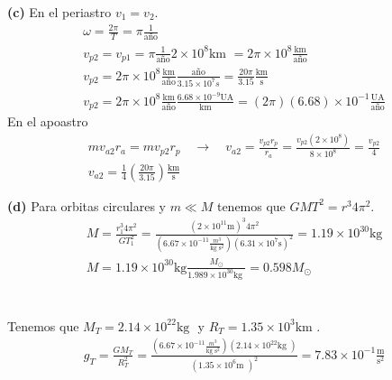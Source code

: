 \documentclass{article}
\begin{document}
\hfill 

\textbf{(c) } En el periastro $ v_1 = v_2  $. 
\begin{gather*}
  \omega = \frac{2\pi}{T} = \pi \frac{1}{\text{año}} \\
  v_{p2} = v_{p1} = \pi \frac{1}{\text{año}} 2 \times 10^8 \text{km } = 2\pi\times10^{8} \frac{\text{km}}{\text{año}} \\
  v _{p2} =2\pi \times10^{8 } \frac{\text{km}}{\text{año}} \frac{\text{año}}{3.15 \times10^{7 } s } = \frac{20\pi }{3.15 } \frac{\text{km}}{\text{s}} \\
  v _{p2}  =2\pi \times10^{8 } \frac{\text{km}}{\text{año}} \frac{6.68 \times10^{-9 }\text{UA}}{ \text{km} } = (2\pi)(6.68)\times10^{-1 } \frac{\text{UA}}{\text{año}} 
\end{gather*}
En el apoastro
\begin{gather*}
  m v _{a2 } r_a = m v _{p2 } r_p \quad \rightarrow \quad v _{a2 } = \frac{v _{p2 } r_p }{r_a } = \frac{v _{p2 } (2 \times10^{8 })}{8 \times10^{8}} = \frac{v _{p2 } }{4} \\
  v _{a2 } = \frac{1}{4}\left(\frac{20\pi}{3.15 }\right) \frac{\text{km}}{\text{s}}
\end{gather*}

\hfill 

\textbf{(d)} Para orbitas circulares y $ m\ll M $ tenemos que $ GM T^2 = r^3 4 \pi^2 $.
\begin{gather*}
  M = \frac{r_1^3 4\pi^2 }{G T_1^2} = \frac{(2 \times10^{11 }\text{m})^3 4\pi^2 }{(6.67 \times10^{-11 }\frac{m^3 }{\text{kg } \text{s}^2})(6.31 \times10^{7 } \text{s})^2} = 1.19 \times10^{30 }\text{kg} \\
  M = 1.19 \times10^{30 }\text{kg} \frac{M _{\odot} }{1.989 \times10^{30} \text{kg }} = 0.598 M _{\odot } 
\end{gather*}

\hfill 

\section{}
Tenemos que $ M_T = 2.14 \times10^{22 }\text{kg } $ y $ R_T = 1.35 \times10^{3 } \text{km } $.
\begin{gather*}
  g_T = \frac{GM_T}{R_T^2 } = \frac{(6.67 \times10^{-11 }\frac{m^3 }{\text{kg } \text{s}^2})(2.14 \times10^{22 }\text{kg })}{(1.35 \times10^{6 } \text{m })^2} = 7.83 \times10^{-1 } \frac{\text{m}}{\text{s}^2 }
\end{gather*}
\end{document}
